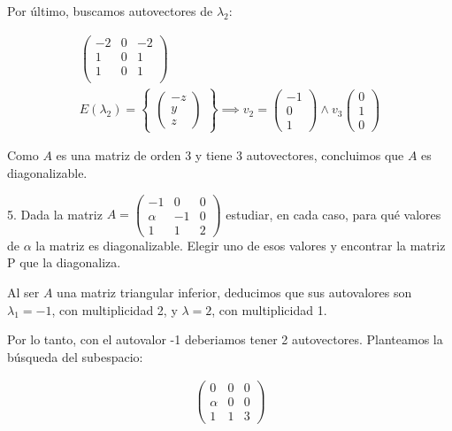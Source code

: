 \documentclass[12pt]{article}
\begin{document}
Por último, buscamos autovectores de \(\lambda_{2}\):

\begin{align*}
	\begin{pmatrix}
		-2 & 0 & -2 \\1&0&1\\1&0&1\\
	\end{pmatrix} \\
	E(\lambda_{2})=
	\begin{Bmatrix}
		\begin{pmatrix}
			-z \\y\\z
		\end{pmatrix}
	\end{Bmatrix}
	\implies
	v_{2}=
	\begin{pmatrix}
		-1 \\0\\1
	\end{pmatrix}
	\land
	v_{3}
	\begin{pmatrix}
		0 \\1\\0
	\end{pmatrix}
\end{align*}

Como \(A\) es una matriz de orden 3 y tiene 3 autovectores,
concluimos que \(A\) es diagonalizable.

\pagebreak

5. Dada la matriz
\(A = \begin{pmatrix}
	-1 & 0 & 0 \\\alpha&-1&0\\1&1&2
\end{pmatrix}\)
estudiar,
en cada caso,
para qué valores de \(\alpha\) la matriz es diagonalizable.
Elegir uno de esos valores y encontrar la matriz P que la diagonaliza.

Al ser \(A\) una matriz triangular inferior,
deducimos que sus autovalores son \(\lambda_{1}=-1\),
con multiplicidad 2,
y \(\lambda=2\),
con multiplicidad 1.

Por lo tanto, con el autovalor -1 deberiamos tener 2 autovectores.
Planteamos la búsqueda del subespacio:

\begin{align*}
	\begin{pmatrix}
		0 & 0 & 0 \\\alpha&0&0\\1&1&3
	\end{pmatrix}
\end{align*}
\end{document}
